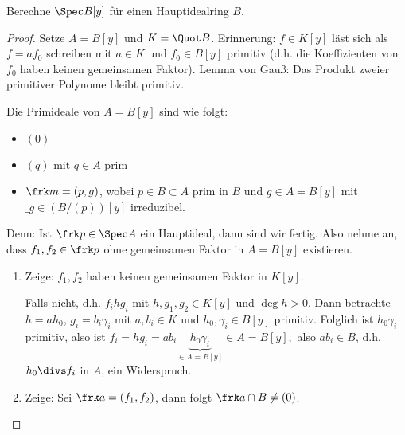 \begin{ex}
    Berechne $\Spec B[y]$ für einen Hauptidealring $B$.
    \begin{proof}
        Setze $A = B[y]$ und $K = \Quot B$.
        Erinnerung: $f \in K[y]$ läst sich als $f = a f_0$ schreiben mit $a \in K$ und $f_0 \in B[y]$ primitiv (d.h. die Koeffizienten von $f_0$ haben keinen gemeinsamen Faktor).
        Lemma von Gauß: Das Produkt zweier primitiver Polynome bleibt primitiv.

        Die Primideale von $A = B[y]$ sind wie folgt:
        \begin{itemize}
            \item
                $(0)$
            \item
                $(q)$ mit $q \in A$ prim
            \item
                $\frk m = (p,g)$, wobei $p \in B \subset A$ prim in $B$ und $g \in A = B[y]$ mit $\_g \in (B / (p))[y]$ irreduzibel.
        \end{itemize}
        Denn:
        Ist $\frk p \in \Spec A$ ein Hauptideal, dann sind wir fertig.
        Also nehme an, dass $f_1, f_2 \in \frk p$ ohne gemeinsamen Faktor in $A = B[y]$ existieren.

        \begin{enumerate}[1.]
            \item
                Zeige: $f_1, f_2$ haben keinen gemeinsamen Faktor in $K[y]$.

                Falls nicht, d.h. $f_i h g_i$ mit $h, g_1, g_2 \in K[y]$ und $\deg h > 0$.
                Dann betrachte $h = a h_0$, $g_i = b_i \gamma_i$ mit $a, b_i \in K$ und $h_0, \gamma_i \in B[y]$ primitiv.
                Folglich ist $h_0 \gamma_i$ primitiv, also ist
                \begin{math}
                    f_i = hg_i = a b_i \underbrace{h_0 \gamma_i}_{\in A = B[y]} \in A = B[y],
                \end{math}
                also $ab_i \in B$, d.h. $h_0 \divs f_i$ in $A$, ein Widerspruch.
            \item
                Zeige: Sei $\frk a = (f_1, f_2)$, dann folgt $\frk a \cap B \neq (0)$.


\end{enumerate}
\end{proof}
\end{ex}

